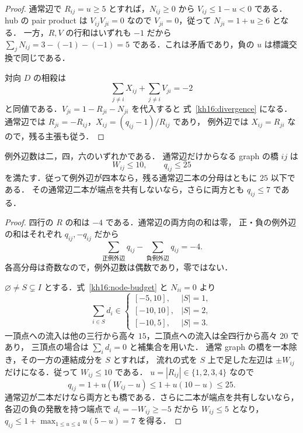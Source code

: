 \begin{proof}
通常辺で $R_{ij}=u\geq5$ とすれば，$N_{ij}\geq0$ から
$V_{ij}\leq1-u<0$ である．hub の pair product は $V_{ij}V_{ji}=0$ なので
$V_{ji}=0$，従って $N_{ji}=1+u\geq6$ となる．
一方，$R,V$ の行和はいずれも $-1$ だから
$\sum_jN_{ij}=3-(-1)-(-1)=5$ である．これは矛盾であり，負の $u$ は標識交換で同じである．

対向 $D$ の相殺は
\[
 \sum_{j\ne i}X_{ij}+\sum_{j\ne i}V_{ji}=-2
\]
と同値である．$V_{ji}=1-R_{ji}-N_{ji}$ を代入すると
式~\eqref{kh16:divergence} になる．通常辺では
$R_{ji}=-R_{ij}$，$X_{ij}=(q_{ij}-1)/R_{ij}$ であり，
例外辺では $X_{ij}=R_{ji}$ なので，残る主張も従う．
\end{proof}

\begin{proposition}
\label{kh16:counts-and-bridges}
例外辺数は二，四，六のいずれかである．
通常辺だけからなる graph の橋 $ij$ は
\begin{equation}\label{kh16:bridge-bound}
 W_{ij}\leq10,\qquad q_{ij}\leq25
\end{equation}
を満たす．従って例外辺が四本なら，残る通常辺二本の分母はともに $25$ 以下である．
その通常辺二本が端点を共有しないなら，さらに両方とも $q_{ij}\leq7$ である．
\end{proposition}

\begin{proof}
四行の $R$ の和は $-4$ である．通常辺の両方向の和は零，
正・負の例外辺の和はそれぞれ $q_{ij},-q_{ij}$ だから
\begin{equation}\label{kh16:exception-balance}
 \sum_{\text{正例外辺}}q_{ij}-\sum_{\text{負例外辺}}q_{ij}=-4.
\end{equation}
各高分母は奇数なので，例外辺数は偶数であり，零ではない．

$\varnothing\ne S\subsetneq I$ とする．式~\eqref{kh16:node-budget} と $N_{ii}=0$ より
\[
 \sum_{i\in S}d_i\in
 \begin{cases}
 [-5,10],&|S|=1,\\
 [-10,10],&|S|=2,\\
 [-10,5],&|S|=3.
 \end{cases}
\]
一頂点への流入は他の三行から高々 $15$，二頂点への流入は全四行から高々 $20$ であり，
三頂点の場合は $\sum_i d_i=0$ と補集合を用いた．
通常 graph の橋を一本除き，その一方の連結成分を $S$ とすれば，
流れの式を $S$ 上で足した左辺は $\pm W_{ij}$ だけになる．従って $W_{ij}\leq10$ である．
$u=|R_{ij}|\in\{1,2,3,4\}$ なので
\[
 q_{ij}=1+u(W_{ij}-u)\leq1+u(10-u)\leq25.
\]
通常辺が二本だけなら両方とも橋である．さらに二本が端点を共有しないなら，
各辺の負の発散を持つ端点で $d_i=-W_{ij}\geq-5$ だから $W_{ij}\leq5$ となり，
$q_{ij}\leq1+\max_{1\leq u\leq4}u(5-u)=7$ を得る．
\end{proof}

